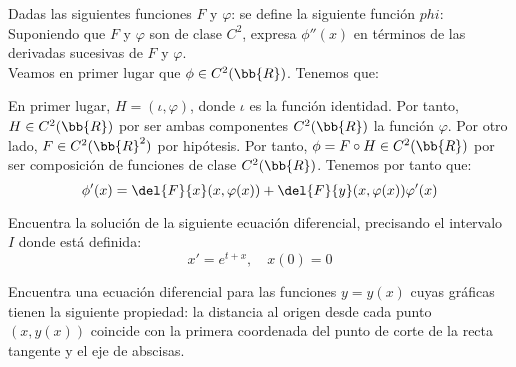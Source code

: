 \documentclass[12pt]{article}
\begin{document}
    \begin{ejercicio}
        Dadas las siguientes funciones $F$ y $\varphi$:
        se define la siguiente función $phi$:
        Suponiendo que $F$ y $\varphi$ son de clase $C^2$, expresa $\phi''(x)$ en términos de las derivadas sucesivas de $F$ y $\varphi$.\\

        Veamos en primer lugar que $\phi\in C^2(\bb{R})$. Tenemos que:
        \begin{figure}[H]
            \centering
        \end{figure}
        En primer lugar, $H=(\iota, \varphi)$, donde $\iota$ es la función identidad. Por tanto, $H\in C^2(\bb{R})$ por ser ambas componentes $C^2(\bb{R})$ la función $\varphi$. Por otro lado, $F\in C^2(\bb{R}^2)$ por hipótesis. Por tanto, $\phi=F\circ H\in C^2(\bb{R})$ por ser composición de funciones de clase $C^2(\bb{R})$.
        Tenemos por tanto que:
        \begin{equation*}
            \phi'(x) = \del{F}{x}(x,\varphi(x)) + \del{F}{y}(x,\varphi(x))\varphi'(x)
        \end{equation*}

    \end{ejercicio}

    \begin{ejercicio}
        Encuentra la solución de la siguiente ecuación diferencial, precisando el intervalo $I$ donde está definida:
        \begin{equation*}
            x' = e^{t+x}, \quad x(0) = 0
        \end{equation*}
    \end{ejercicio}

    \begin{ejercicio}
        Encuentra una ecuación diferencial para las funciones $y=y(x)$ cuyas gráficas tienen la siguiente propiedad:
        la distancia al origen desde cada punto $(x,y(x))$ coincide con la primera coordenada del punto de corte de la recta tangente y el eje de abscisas.
    \end{ejercicio}
\end{document}
